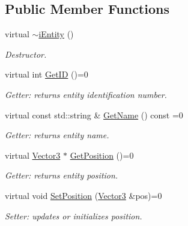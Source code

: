 \subsection*{Public Member Functions}
\begin{DoxyCompactItemize}
\item 
\mbox{\label{classiEntity_ab8633da01cab1d5a6aa565ac45a74c59}} 
virtual \hyperlink{classiEntity_ab8633da01cab1d5a6aa565ac45a74c59}{$\sim$i\+Entity} ()
\begin{DoxyCompactList}\small\item\em Destructor. \end{DoxyCompactList}\item 
\mbox{\label{classiEntity_afff83e95a9777dfaa7cf48bad6fbb79c}} 
virtual int \hyperlink{classiEntity_afff83e95a9777dfaa7cf48bad6fbb79c}{Get\+ID} ()=0
\begin{DoxyCompactList}\small\item\em Getter\+: returns entity identification number. \end{DoxyCompactList}\item 
\mbox{\label{classiEntity_a4c71545cc2dec140595b5c1e1be8ac32}} 
virtual const std\+::string \& \hyperlink{classiEntity_a4c71545cc2dec140595b5c1e1be8ac32}{Get\+Name} () const =0
\begin{DoxyCompactList}\small\item\em Getter\+: returns entity name. \end{DoxyCompactList}\item 
\mbox{\label{classiEntity_a2e94d2de4d37792e6f491405ac259aeb}} 
virtual \hyperlink{classVector3}{Vector3} $\ast$ \hyperlink{classiEntity_a2e94d2de4d37792e6f491405ac259aeb}{Get\+Position} ()=0
\begin{DoxyCompactList}\small\item\em Getter\+: returns entity position. \end{DoxyCompactList}\item 
\mbox{\label{classiEntity_afa1966ac1964902c1e69907307ca03d4}} 
virtual void \hyperlink{classiEntity_afa1966ac1964902c1e69907307ca03d4}{Set\+Position} (\hyperlink{classVector3}{Vector3} \&pos)=0
\begin{DoxyCompactList}\small\item\em Setter\+: updates or initializes position. \end{DoxyCompactList}\end{DoxyCompactItemize}


